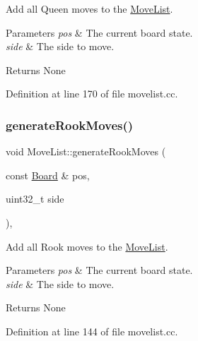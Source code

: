 Add all Queen moves to the \mbox{\hyperlink{classMoveList}{Move\+List}}. 


\begin{DoxyParams}{Parameters}
{\em pos} & The current board state. \\
\hline
{\em side} & The side to move. \\
\hline
\end{DoxyParams}
\begin{DoxyReturn}{Returns}
None 
\end{DoxyReturn}


Definition at line 170 of file movelist.\+cc.

\mbox{\label{classMoveList_a2f10e1e4e2b5bec034656a3038b42d95}} 
\subsubsection{\texorpdfstring{generate\+Rook\+Moves()}{generateRookMoves()}}
{\footnotesize\ttfamily void Move\+List\+::generate\+Rook\+Moves (\begin{DoxyParamCaption}\item[{const \mbox{\hyperlink{classBoard}{Board}} \&}]{pos,  }\item[{uint32\+\_\+t}]{side }\end{DoxyParamCaption})\hspace{0.3cm}{\ttfamily [private]}, {\ttfamily [noexcept]}}



Add all Rook moves to the \mbox{\hyperlink{classMoveList}{Move\+List}}. 


\begin{DoxyParams}{Parameters}
{\em pos} & The current board state. \\
\hline
{\em side} & The side to move. \\
\hline
\end{DoxyParams}
\begin{DoxyReturn}{Returns}
None 
\end{DoxyReturn}


Definition at line 144 of file movelist.\+cc.

\mbox{\label{classMoveList_a631546d45818cb40c204dde6fa368ea8}} 
